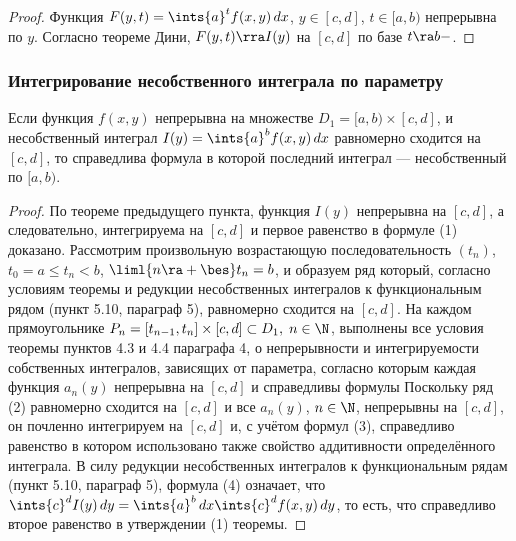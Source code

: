 \documentclass[a4paper]{article}
\begin{document}
\begin{proof}
Функция $F(y,t) = \ints{a}^t f(x,y)\,dx$, $y\in[c,d]$, $t\in[a,b)$
непрерывна по $y$. Согласно теореме Дини, $F(y,t)\rra I(y)$ на
$[c,d]$ по базе $t\ra b-$.
\end{proof}

\subsubsection{Интегрирование несобственного интеграла по параметру}

\begin{theorem}
Если функция $f(x,y)$ непрерывна на множестве
$D_1=[a,b)\times[c,d]$, и несобственный интеграл $I(y) = \ints{a}^b
f(x,y)\,dx$ равномерно сходится на $[c,d]$, то справедлива формула
 в которой последний интеграл
--- несобственный по $[a,b)$.
\end{theorem}

\begin{proof}
По теореме предыдущего пункта, функция $I(y)$ непрерывна на $[c,d]$,
а следовательно, интегрируема на $[c,d]$ и первое равенство в
формуле (1) доказано. Рассмотрим произвольную возрастающую
последовательность $(t_n)$, $t_0=a\le t_n < b$, $\liml{n\ra+\bes}
t_n=b$, и образуем ряд  который, согласно условиям теоремы и редукции
несобственных интегралов к функциональным рядом (пункт 5.10,
параграф 5), равномерно сходится на $[c,d]$. На каждом
прямоугольнике $P_n = [t_{n-1},t_n]\times[c,d] \subset D_1, \;
n\in\N$, выполнены все условия теоремы пунктов 4.3 и 4.4 параграфа
4, о непрерывности и интегрируемости собственных интегралов,
зависящих от параметра, согласно которым каждая функция $a_n(y)$
непрерывна на $[c,d]$ и справедливы формулы 
Поскольку ряд (2) равномерно сходится на $[c,d]$ и все $a_n(y)$,
$n\in\N$, непрерывны на $[c,d]$, он почленно интегрируем на $[c,d]$
и, с учётом формул (3), справедливо равенство  в
котором использовано также свойство аддитивности определённого
интеграла. В силу редукции несобственных интегралов к функциональным
рядам (пункт 5.10, параграф 5), формула (4) означает, что
$\ints{c}^d I(y)\,dy =\ints{a}^b \,dx \ints{c}^d f(x,y)\,dy$, то
есть, что справедливо второе равенство в утверждении (1) теоремы.
\end{proof}
\end{document}
